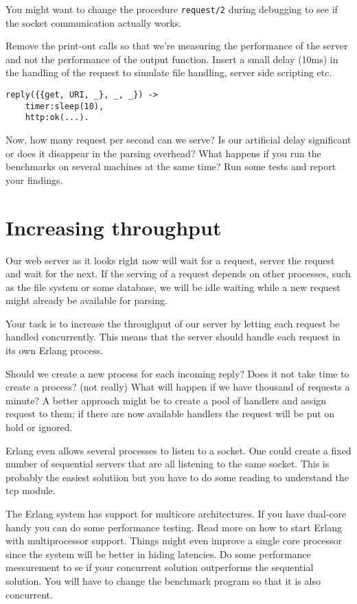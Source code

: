 \documentclass[a4paper,11pt]{article}
\begin{document}
You might want to change the procedure {\tt request/2} during
debugging to see if the socket communication actually works.

Remove the print-out calls so that we're measuring the performance of
the server and not the performance of the output function. Insert a
small delay (10ms) in the handling of the request to simulate file
handling, server side scripting etc.

\begin{verbatim}
reply({{get, URI, _}, _, _}) ->    
    timer:sleep(10),
    http:ok(...).
\end{verbatim}

Now, how many request per second can we serve? Is our artificial delay
significant or does it disappear in the parsing overhead? What happens
if you run the benchmarks on several machines at the same time? Run
some tests and report your findings.


\section{Increasing throughput}

Our web server as it looks right now will wait for a request, server
the request and wait for the next. If the serving of a request depends
on other processes, such as the file system or some database, we will
be idle waiting while a new request might already be available for
parsing. 

Your task is to increase the throughput of our server by letting each
request be handled concurrently. This means that the server should
handle each request in its own Erlang process.

Should we create a new process for each incoming reply? Does it not
take time to create a process? (not really) What will happen if we
have thousand of requests a minute? A better approach might be to
create a pool of handlers and assign request to them; if there are now
available handlers the request will be put on hold or ignored.

Erlang even allows several processes to listen to a socket. One could
create a fixed number of sequential servers that are all listening to
the same socket. This is probably the easiest solutiion but you have
to do some reading to understand the tcp module.

The Erlang system has support for multicore architectures. If you have
dual-core handy you can do some performance testing. Read more on how
to start Erlang with multiprocessor support. Things might even improve
a single core processor since the system will be better in hiding
latencies. Do some performance messurement to se if your concurrent
solution outperforms the sequential solution. You will have to change
the benchmark program so that it is also concurrent.
\end{document}

